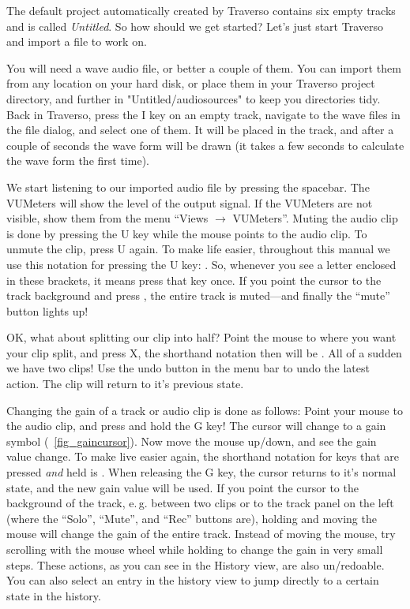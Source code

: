 The default project automatically created by Traverso contains six empty tracks and is called \emph{Untitled}. So how should we get started?
Let's just start Traverso and import a file to work on.

You will need a wave audio file, or better a couple of them. You can import them from any location on your hard disk, or place them in your Traverso project directory, and further in "Untitled/audiosources" to keep you directories tidy. Back in Traverso, press the I key on an empty track, navigate to the wave files in the file dialog, and select one of them. It will be placed in the track, and after a couple of seconds the wave form will be drawn (it takes a few seconds to calculate the wave form the first time).

We start listening to our imported audio file by pressing the spacebar. The VUMeters will show the level of the output signal. If the VUMeters are not visible, show them from the menu ``Views $\rightarrow$ VUMeters''. Muting the audio clip is done by pressing the U key while the mouse points to the audio clip. To unmute the clip, press U again. To make life easier, throughout this manual we use this notation for pressing the U key: . So, whenever you see a letter enclosed in these brackets, it means press that key once. If you point the cursor to the track background and press , the entire track is muted---and finally the ``mute'' button lights up!

OK, what about splitting our clip into half? Point the mouse to where you want your clip split, and press X, the shorthand notation then will be . All of a sudden we have two clips! Use the undo button in the menu bar to undo the latest action. The clip will return to it's previous state.

Changing the gain of a track or audio clip is done as follows: Point your mouse to the audio clip, and press and hold the G key! The cursor will change to a gain symbol (\FigB\ \ref{fig_gaincursor}). Now move the mouse up/down, and see the gain value change. To make live easier again, the shorthand notation for keys that are pressed \emph{and} held is . When releasing the G key, the cursor returns to it's normal state, and the new gain value will be used. If you point the cursor to the background of the track, e.\,g. between two clips or to the track panel on the left (where the ``Solo'', ``Mute'', and ``Rec'' buttons are), holding  and moving the mouse will change the gain of the entire track. Instead of moving the mouse, try scrolling with the mouse wheel while holding  to change the gain in very small steps. These actions, as you can see in the History view, are also un/redoable. You can also select an entry in the history view to jump directly to a certain state in the history.

